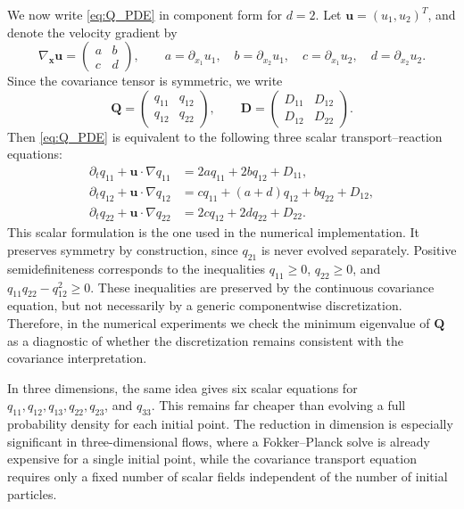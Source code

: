 \documentclass[a4paper,11pt]{article}
\numberwithin{equation}{section}
\theoremstyle{plain}
\theoremstyle{definition}
\theoremstyle{remark}
\newcommand{\bx}{\mathbf{x}}
\newcommand{\bu}{\mathbf{u}}
\newcommand{\bD}{\mathbf{D}}
\newcommand{\bQ}{\mathbf{Q}}
\begin{document}
We now write \eqref{eq:Q_PDE} in component form for \(d=2\).  Let \(\bu=(u_1,u_2)^T\), and denote the velocity gradient by
\[
    \nabla_{\bx}\bu
    =
    \begin{pmatrix}
    a & b\\
    c & d
    \end{pmatrix},
    \qquad
    a=\partial_{x_1}u_1,\quad
    b=\partial_{x_2}u_1,\quad
    c=\partial_{x_1}u_2,\quad
    d=\partial_{x_2}u_2 .
\]
Since the covariance tensor is symmetric, we write
\[
    \bQ=
    \begin{pmatrix}
    q_{11} & q_{12}\\
    q_{12} & q_{22}
    \end{pmatrix},
    \qquad
    \bD=
    \begin{pmatrix}
    D_{11} & D_{12}\\
    D_{12} & D_{22}
    \end{pmatrix}.
\]
Then \eqref{eq:Q_PDE} is equivalent to the following three scalar transport--reaction equations:
\begin{equation}
\begin{aligned}
    \partial_t q_{11}+\bu\cdot\nabla q_{11}
    &=2a q_{11}+2b q_{12}+D_{11},\\
    \partial_t q_{12}+\bu\cdot\nabla q_{12}
    &=c q_{11}+(a+d)q_{12}+b q_{22}+D_{12},\\
    \partial_t q_{22}+\bu\cdot\nabla q_{22}
    &=2c q_{12}+2d q_{22}+D_{22}.
\end{aligned}
\label{eq:component_2d}
\end{equation}
This scalar formulation is the one used in the numerical implementation.  It preserves symmetry by construction, since \(q_{21}\) is never evolved separately.  Positive semidefiniteness corresponds to the inequalities \(q_{11}\geq0\), \(q_{22}\geq0\), and \(q_{11}q_{22}-q_{12}^2\geq0\).  These inequalities are preserved by the continuous covariance equation, but not necessarily by a generic componentwise discretization.  Therefore, in the numerical experiments we check the minimum eigenvalue of \(\bQ\) as a diagnostic of whether the discretization remains consistent with the covariance interpretation.

In three dimensions, the same idea gives six scalar equations for \(q_{11},q_{12},q_{13},q_{22},q_{23}\), and \(q_{33}\).  This remains far cheaper than evolving a full probability density for each initial point.  The reduction in dimension is especially significant in three-dimensional flows, where a Fokker--Planck solve is already expensive for a single initial point, while the covariance transport equation requires only a fixed number of scalar fields independent of the number of initial particles.
\end{document}
